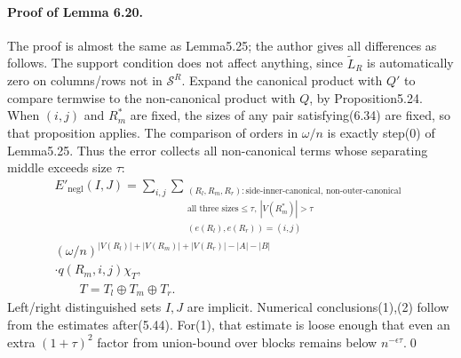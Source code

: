 \paragraph{Proof of Lemma 6.20.} The proof is almost the same as Lemma5.25; the author gives all differences as follows. The support condition does not affect anything, since $\widetilde L_R$ is automatically zero on columns/rows not in $\mathcal S^R$. Expand the canonical product with $Q'$ to compare termwise to the non-canonical product with $Q$, by Proposition5.24. When $(i,j)$ and $R^*_m$ are fixed, the sizes of any pair satisfying(6.34) are fixed, so that proposition applies. The comparison of orders in $\omega/n$ is exactly step(0) of Lemma5.25. Thus the error collects all non-canonical terms whose separating middle exceeds size $\tau$:
\begin{multline*}E'_{\mathrm{negl}}(I,J)=\sum_{i,j}\sum_{\substack{(R_l,R_m,R_r):\text{side-inner-canonical, non-outer-canonical}\\\text{all three sizes}\le\tau,\ |V(R^*_m)|>\tau\\(e(R_l),e(R_r))=(i,j)}}\\
(\omega/n)^{|V(R_l)|+|V(R_m)|+|V(R_r)|-|A|-|B|}\\\cdot q(R_m,i,j)\chi_T,\\
\qquad T=T_l\oplus T_m\oplus T_r.\tag{6.37}\end{multline*}
Left/right distinguished sets $I,J$ are implicit. Numerical conclusions(1),(2) follow from the estimates after(5.44). For(1), that estimate is loose enough that even an extra $(1+\tau)^2$ factor from union-bound over blocks remains below $n^{-\epsilon\tau}$.\qed
